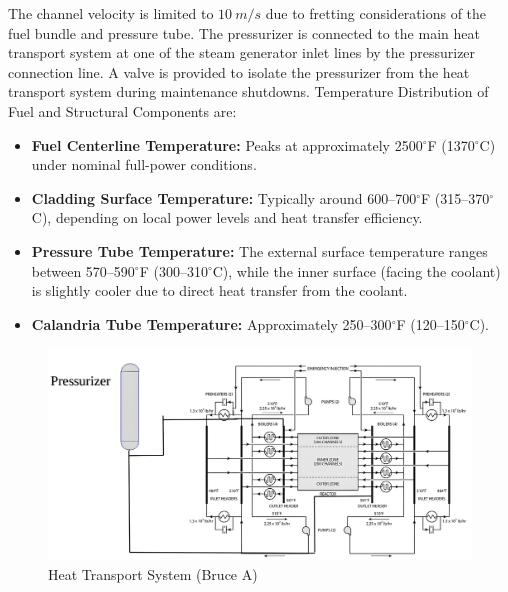 \documentclass[12pt]{article}
\begin{document}
\begin{multicols}{2}
The channel velocity is limited to $10\ m/s$ due to fretting considerations of the fuel bundle and pressure tube. The pressurizer is connected to the main heat transport system at one of the steam generator inlet lines by the pressurizer connection line. A valve is provided to isolate the pressurizer from the heat transport system during maintenance shutdowns. Temperature Distribution of Fuel and Structural Components are:

\begin{itemize}
    \item \textbf{Fuel Centerline Temperature:} Peaks at approximately 2500$^{\circ}$F (1370$^{\circ}$C) under nominal full-power conditions.
    \item \textbf{Cladding Surface Temperature:} Typically around 600–700$^{\circ}$F (315–370$^{\circ}$C), depending on local power levels and heat transfer efficiency.
    \item \textbf{Pressure Tube Temperature:} The external surface temperature ranges between 570–590$^{\circ}$F (300–310$^{\circ}$C), while the inner surface (facing the coolant) is slightly cooler due to direct heat transfer from the coolant.
    \item \textbf{Calandria Tube Temperature:} Approximately 250–300$^{\circ}$F (120–150$^{\circ}$C).
\end{itemize}

\end{multicols}

\begin{figure}
    \centering
    \includegraphics[width=0.7\linewidth]{figs/HTS.png}
    \caption{Heat Transport System (Bruce A)}
    \label{fig:fig_2}
\end{figure}
\end{document}
